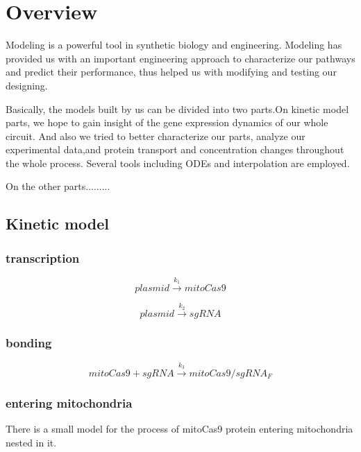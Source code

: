 \section{Overview}
Modeling is a powerful tool in synthetic biology and engineering. Modeling has provided us with an important engineering approach to characterize our pathways and predict their performance, thus helped us with modifying and testing our designing.

Basically, the models built by us can be divided into two parts.On kinetic model parts, we hope to gain insight of the gene expression dynamics of our whole circuit. And also we tried to better characterize our parts, analyze our experimental data,and protein transport and concentration changes throughout the whole process. Several tools including ODEs and interpolation are employed.
	
On the other parts.........
	
\subsection{Kinetic model}
  
\subsubsection{transcription}
	
\begin{equation}
plasmid \stackrel{k_1}{\longrightarrow} mitoCas9 
\end{equation}

\begin{equation}
plasmid\stackrel{k_2}{\longrightarrow}sgRNA
\end{equation}

\subsubsection{bonding}

\begin{equation}
mitoCas9+sgRNA\stackrel{k_3}{\longrightarrow}mitoCas9/sgRNA_F
\end{equation}

\subsubsection{entering mitochondria}
There is a small model for the process of mitoCas9 protein entering mitochondria nested in it.

